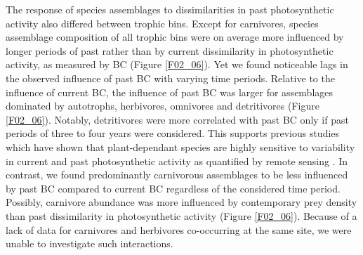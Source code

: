 The response of species assemblages to dissimilarities in past photosynthetic activity also differed between trophic bins. Except for carnivores, species assemblage composition of all trophic bins were on average more influenced by longer periods of past rather than by current dissimilarity in photosynthetic activity, as measured by BC (Figure \ref{F02_06}). Yet we found noticeable lags in the observed influence of past BC with varying time periods. Relative to the influence of current BC, the influence of past BC was larger for assemblages dominated by autotrophs, herbivores, omnivores and detritivores (Figure \ref{F02_06}). Notably, detritivores were more correlated with past BC only if past periods of three to four years were considered. This supports previous studies which have shown that plant-dependant species are highly sensitive to variability in current and past photosynthetic activity as quantified by remote sensing \citep{Pettorelli2006,Newton2014}. In contrast, we found predominantly carnivorous assemblages to be less influenced by past BC compared to current BC regardless of the considered time period. Possibly, carnivore abundance was more influenced by contemporary prey density \citep{Terborgh2015} than past dissimilarity in photosynthetic activity (Figure \ref{F02_06}). Because of a lack of data for carnivores and herbivores co-occurring at the same site, we were unable to investigate such interactions. 

